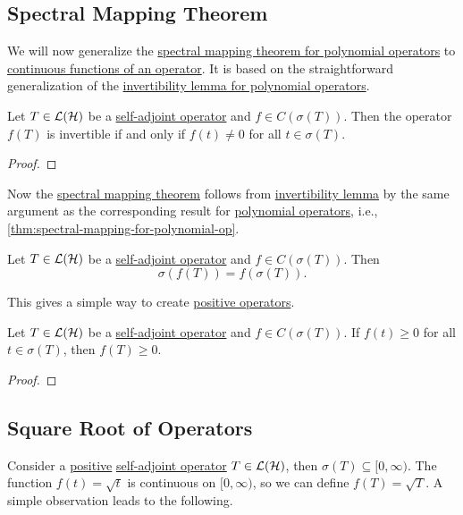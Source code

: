 \subsection{Spectral Mapping Theorem}
We will now generalize the \hyperref[thm:spectral-mapping-for-polynomial-op]{spectral mapping theorem for polynomial operators} to \hyperref[def:continuous-function-op]{continuous functions of an operator}. It is based on the straightforward generalization of the \hyperref[lma:invertibility-for-polynomial-op]{invertibility lemma for polynomial operators}.

\begin{lemma}[Invertibility]\label{lma:invertibility}
	Let \(T\in \mathcal{\MakeUppercase{l}} (\mathcal{\MakeUppercase{h}} )\) be a \hyperref[def:self-adjoint-op]{self-adjoint operator} and \(f\in C(\sigma (T))\). Then the operator \(f(T)\) is invertible if and only if \(f(t) \neq 0\) for all \(t\in \sigma (T)\).
\end{lemma}
\begin{proof}

\end{proof}

Now the \hyperref[thm:spectral-mapping]{spectral mapping theorem} follows from \hyperref[lma:invertibility]{invertibility lemma} by the same argument as the corresponding result for \hyperref[def:polynomial-op]{polynomial operators}, i.e., \autoref{thm:spectral-mapping-for-polynomial-op}.

\begin{theorem}\label{thm:spectral-mapping}
	Let \(T\in \mathcal{\MakeUppercase{l}} (\mathcal{\MakeUppercase{h}} )\) be a \hyperref[def:self-adjoint-op]{self-adjoint operator} and \(f\in C(\sigma (T))\). Then
	\[
		\sigma (f(T)) = f(\sigma (T)).
	\]
\end{theorem}

This gives a simple way to create \hyperref[def:positive-op]{positive operators}.

\begin{corollary}
	Let \(T\in \mathcal{\MakeUppercase{l}} (\mathcal{\MakeUppercase{h}} )\) be a \hyperref[def:self-adjoint-op]{self-adjoint operator} and \(f\in C(\sigma (T))\). If \(f(t) \geq 0\) for all \(t\in \sigma (T)\), then \(f(T) \geq 0\).
\end{corollary}
\begin{proof}

\end{proof}

\subsection{Square Root of Operators}
Consider a \hyperref[def:positive-op]{positive} \hyperref[def:self-adjoint-op]{self-adjoint operator} \(T\in \mathcal{\MakeUppercase{l}} (\mathcal{\MakeUppercase{h}} )\), then \(\sigma (T) \subseteq [0, \infty )\). The function \(f(t) = \sqrt{t} \) is continuous on \([0, \infty )\), so we can define \(f(T) = \sqrt{T} \). A simple observation leads to the following.

